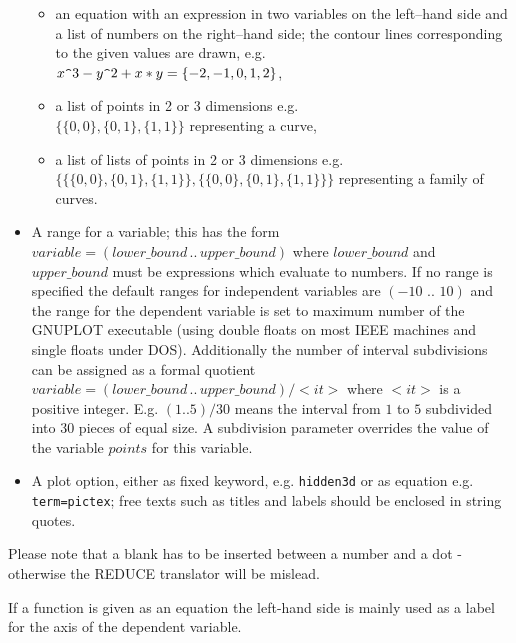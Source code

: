 \begin{itemize}
\begin{itemize}
    \item an equation with an expression in two variables on the 
         left--hand side and a list of numbers on the 
         right--hand side; the contour lines corresponding
         to the given values are drawn, e.g.
            \\ $x{\verb+^+}3 - y{\verb+^+}2 + x*y= \{-2,-1,0,1,2\}$,

    \item a list of points in 2 or 3 dimensions
         e.g. \\ $\{\{0,0\},\{0,1\},\{1,1\}\}$ representing
         a curve,

    \item a list of lists of points in 2 or 3 dimensions
         e.g.\\ $\{\{\{0,0\},\{0,1\},\{1,1\}\},
                 \{\{0,0\},\{0,1\},\{1,1\}\}\}$
         representing a family of curves.
  \end{itemize}

\item A range for a variable; this has the form\\
    $variable=(lower\_bound\, . . \, upper\_bound)$ where
  $lower\_bound$ and $upper\_bound$ must be expressions which
  evaluate to numbers. If no range is specified the
  default ranges for independent variables are $(-10\,\,..\,\,10)$
  and the range for the dependent variable is set to 
  maximum number of the GNUPLOT executable (using double
  floats on most IEEE machines and single floats under DOS).
  Additionally the number of interval subdivisions can be
  assigned as a formal quotient\\
    $variable=(lower\_bound\, . . \, upper\_bound)/<it>$
  where $<it>$ is a positive integer. E.g.
    $(1 .. 5)/30$ means the interval from $1$ to $5$
  subdivided into $30$ pieces of equal size. A subdivision
  parameter overrides the value of the variable $points$
  for this variable.
  


\item A plot option, either as fixed keyword,
  e.g. \verb$hidden3d$ or as equation e.g. \verb$term=pictex$;
  free texts such as titles and labels should be enclosed in
  string quotes.
\end{itemize}
Please note that a blank has to be inserted between a number
and a dot - otherwise the REDUCE translator will be mislead.
 
If a function is given as an equation the left-hand side
  is mainly used as a label for the axis of the dependent variable.

